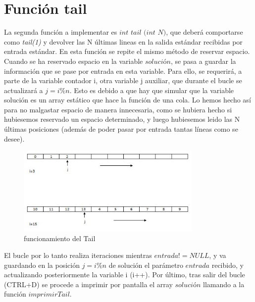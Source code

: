 \section{Función tail}
La segunda función a implementar es $int$ $tail$ $(int$ $N)$, que deberá comportarse como \textit{tail(1)} y devolver las N últimas lineas en la salida estándar recibidas por entrada estándar.
En esta función se repite el mismo método de reservar espacio. Cuando se ha reservado espacio en la variable $solución$, se pasa a guardar la información que se pase por entrada en esta variable. Para ello, se requerirá, a parte de la variable contador i, otra variable j auxiliar, que durante el bucle se actualizará a $j=i\%n$. Esto es debido a que hay que simular que la variable solución es un array estático que hace la función de una cola. Lo hemos hecho así para no malgastar espacio de manera innecesaria, como se hubiera hecho si hubiesemos reservado un espacio determinado, y luego hubiesemos leido las N últimas posiciones (además de poder pasar por entrada tantas líneas como se desee).
\begin{figure}[htb]
\begin{center}
\centering
  \includegraphics[width=0.8\textwidth]{./img_1}
  \caption{funcionamiento del Tail}
  \label{fig:Funcionamiento del Tail}
\end{center}
\end{figure} 

El bucle por lo tanto realiza iteraciones mientras $entrada != NULL$, y va guardando en la posición $j=i\%n$ de solución el parámetro $entrada$ recibido, y actualizando posteriormente la variable i (i++).
Por último, tras salir del bucle (CTRL+D) se procede a imprimir por pantalla el array $solución$ llamando a la función $imprimirTail$.
